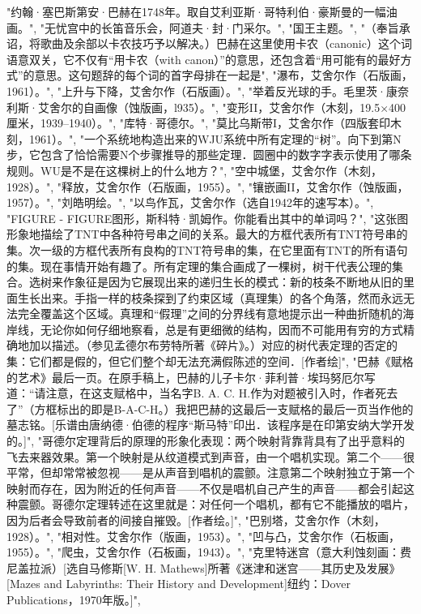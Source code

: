"约翰·塞巴斯第安·巴赫在1748年。取自艾利亚斯·哥特利伯·豪斯曼的一幅油画。",
"无忧宫中的长笛音乐会，阿道夫·封·门采尔。",
"\label {fig:3}国王主题。",
"（奉旨承诏，将歌曲及余部以卡农技巧予以解决。）巴赫在这里使用卡农（canonic）这个词语意双关，它不仅有“用卡农（with canon）”的意思，还包含着“用可能有的最好方式”的意思。这句题辞的每个词的首字母排在一起是",
"\label {fig:5}瀑布，艾舍尔作（石版画，1961）。",
"\label {fig:6}上升与下降，艾舍尔作（石版画）。",
"举着反光球的手。毛里茨·康奈利斯·艾舍尔的自画像（蚀版画，l935）。",
"变形II，艾舍尔作（木刻，19.5×400厘米，1939--1940）。",
"库特·哥德尔。",
"莫比乌斯带I，艾舍尔作（四版套印木刻，1961）。",
"一个系统地构造出来的WJU系统中所有定理的“树”。向下到第N步，它包含了恰恰需要N个步骤推导的那些定理．圆圈中的数字字表示使用了哪条规则。WU是不是在这棵树上的什么地方？",
"空中城堡，艾舍尔作（木刻，1928）。",
"释放，艾舍尔作（石版画，1955）。",
"镶嵌画II，艾舍尔作（蚀版画，1957）。",
"刘皓明绘。",
"以鸟作瓦，艾舍尔作（选自1942年的速写本）。",
"FIGURE - FIGURE图形，斯科特·凯姆作。你能看出其中的单词吗？",
"\label {fig:18}这张图形象地描绘了TNT中各种符号串之间的关系。最大的方框代表所有TNT符号串的集。次一级的方框代表所有良构的TNT符号串的集，在它里面有TNT的所有语句的集。现在事情开始有趣了。所有定理的集合画成了一棵树，树干代表公理的集合。选树来作象征是因为它展现出来的递归生长的模式：新的枝条不断地从旧的里面生长出来。手指一样的枝条探到了约束区域（真理集）的各个角落，然而永远无法完全覆盖这个区域。真理和“假理”之间的分界线有意地提示出一种曲折随机的海岸线，无论你如何仔细地察看，总是有更细微的结构，因而不可能用有穷的方式精确地加以描述。（参见孟德尔布劳特所著《碎片》。）对应的树代表定理的否定的集：它们都是假的，但它们整个却无法充满假陈述的空间．[作者绘]",
"巴赫《赋格的艺术》最后一页。在原手稿上，巴赫的儿子卡尔·菲利普·埃玛努厄尔写道：“请注意，在这支赋格中，当名字B. A. C. H.作为对题被引入时，作者死去了”（方框标出的即是B-A-C-H。）我把巴赫的这最后一支赋格的最后一页当作他的墓志铭。[乐谱由唐纳德·伯德的程序“斯马特”印出．该程序是在印第安纳大学开发的。]",
"哥德尔定理背后的原理的形象化表现：两个映射背靠背具有了出乎意料的飞去来器效果。第一个映射是从纹道模式到声音，由一个唱机实现。第二个——很平常，但却常常被忽视——是从声音到唱机的震颤。注意第二个映射独立于第一个映射而存在，因为附近的任何声音——不仅是唱机自己产生的声音——都会引起这种震颤。哥德尔定理转述在这里就是：对任何一个唱机，都有它不能播放的唱片，因为后者会导致前者的间接自摧毁。[作者绘。]",
"巴别塔，艾舍尔作（木刻，1928）。",
"相对性。艾舍尔作（版画，1953）。",
"\label {fig:23}凹与凸，艾舍尔作（石板画，1955）。",
"爬虫，艾舍尔作（石板画，1943）。",
"克里特迷宫（意大利蚀刻画：费尼盖拉派）[选自马修斯[W. H. Mathews]所著《迷津和迷宫——其历史及发展》[Mazes and Labyrinths: Their History and Development]纽约：Dover Publications，1970年版。]",
